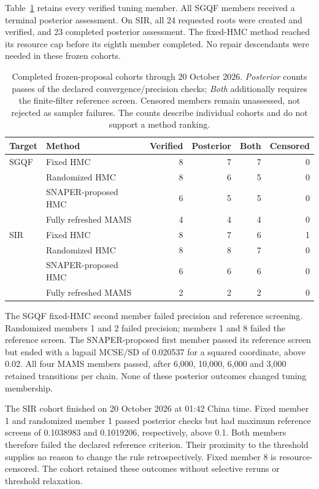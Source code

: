 Table~\ref{tab:bf-modern-cohort-results} retains every verified tuning member.
All SGQF members received a terminal posterior assessment. On SIR, all 24
requested roots were created and verified, and 23 completed posterior
assessment. The fixed-HMC method reached its resource cap before its eighth
member completed. No repair descendants were needed in these frozen cohorts.

\begin{table}[htbp]
\centering\small
\begin{tabular}{llrrrr}
\toprule
Target & Method & Verified & Posterior & Both & Censored\\
\midrule
SGQF & Fixed HMC & 8 & 7 & 7 & 0\\
 & Randomized HMC & 8 & 6 & 5 & 0\\
 & SNAPER-proposed HMC & 6 & 5 & 5 & 0\\
 & Fully refreshed MAMS & 4 & 4 & 4 & 0\\
\midrule
SIR & Fixed HMC & 8 & 7 & 6 & 1\\
 & Randomized HMC & 8 & 8 & 7 & 0\\
 & SNAPER-proposed HMC & 6 & 6 & 6 & 0\\
 & Fully refreshed MAMS & 2 & 2 & 2 & 0\\
\bottomrule
\end{tabular}
\caption{Completed frozen-proposal cohorts through 20 October 2026.
\emph{Posterior} counts passes of the declared convergence/precision checks;
\emph{Both} additionally requires the finite-filter reference screen.
Censored members remain unassessed, not rejected as sampler failures.
The counts describe individual cohorts and do not support a method ranking.}
\label{tab:bf-modern-cohort-results}
\end{table}

The SGQF fixed-HMC second member failed precision and reference screening.
Randomized members 1 and 2 failed precision; members 1 and 8 failed the
reference screen. The SNAPER-proposed first member passed its reference
screen but ended with a lugsail MCSE/SD of 0.020537 for a squared coordinate,
above 0.02. All four MAMS members passed, after 6,000, 10,000, 6,000 and
3,000 retained transitions per chain. None of these posterior outcomes
changed tuning membership.

The SIR cohort finished on 20 October 2026 at 01:42 China time. Fixed member
1 and randomized member 1 passed posterior checks but had maximum reference
screens of 0.1038983 and 0.1019206, respectively, above 0.1. Both members
therefore failed the declared reference criterion. Their proximity to the
threshold supplies no reason to change the rule retrospectively. Fixed
member 8 is resource-censored. The cohort retained these outcomes without
selective reruns or threshold relaxation.

